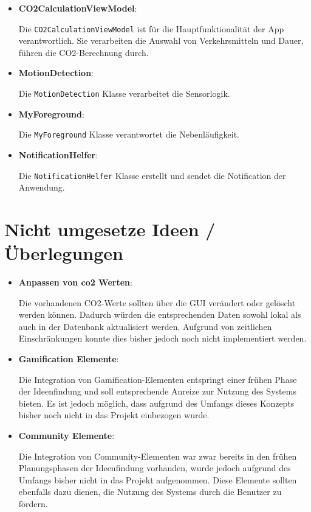 \documentclass{article}
\begin{document}
\begin{itemize}
\item \textbf{CO2CalculationViewModel}:

 Die  \texttt{CO2CalculationViewModel} ist für die Hauptfunktionalität der App verantwortlich. Sie verarbeiten die Auswahl von Verkehrsmitteln und Dauer, führen die CO2-Berechnung durch. 
 
 \item \textbf{MotionDetection}:
 
 Die \texttt{MotionDetection} Klasse verarbeitet die Sensorlogik.
 
 \item \textbf{MyForeground}:
 
 Die \texttt{MyForeground} Klasse verantwortet die Nebenläufigkeit. 
 
 \item \textbf{NotificationHelfer}:
 
 Die \texttt{NotificationHelfer} Klasse erstellt und sendet die Notification der Anwendung.
 
\end{itemize}


\section{Nicht umgesetze Ideen / Überlegungen}

    \begin{itemize}
    \item \textbf{Anpassen von co2 Werten}:
    
    Die vorhandenen CO2-Werte sollten über die GUI verändert oder gelöscht werden können. Dadurch würden die entsprechenden Daten sowohl lokal als auch in der Datenbank aktualisiert werden. Aufgrund von zeitlichen Einschränkungen konnte dies bisher jedoch noch nicht implementiert werden.
    
    \item \textbf{Gamification Elemente}:
    
    Die Integration von Gamification-Elementen entspringt einer frühen Phase der Ideenfindung und soll entsprechende Anreize zur Nutzung des Systems bieten. Es ist jedoch möglich, dass aufgrund des Umfangs dieses Konzepts bisher noch nicht in das Projekt einbezogen wurde.
    
    \item \textbf{Community Elemente}:
    
    Die Integration von Community-Elementen war zwar bereits in den frühen Planungsphasen der Ideenfindung vorhanden, wurde jedoch aufgrund des Umfangs bisher nicht in das Projekt aufgenommen. Diese Elemente sollten ebenfalls dazu dienen, die Nutzung des Systems durch die Benutzer zu fördern.
    \end{itemize}
    
\end{document}
